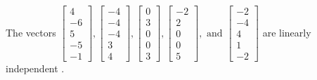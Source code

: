 \begin{exercise}
\begin{exerciseStatement}
  \end{exerciseStatement}
  \begin{exerciseAnswer}
   The vectors \(\left[\begin{array}{r}
4 \\
-6 \\
5 \\
-5 \\
-1
\end{array}\right] , \left[\begin{array}{r}
-4 \\
-4 \\
-4 \\
3 \\
4
\end{array}\right] , \left[\begin{array}{r}
0 \\
3 \\
0 \\
0 \\
3
\end{array}\right] , \left[\begin{array}{r}
-2 \\
2 \\
0 \\
0 \\
5
\end{array}\right] , \text{ and } \left[\begin{array}{r}
-2 \\
-4 \\
4 \\
1 \\
-2
\end{array}\right]\) are 
  	 linearly independent  .
  


  \end{exerciseAnswer}
\end{exercise}